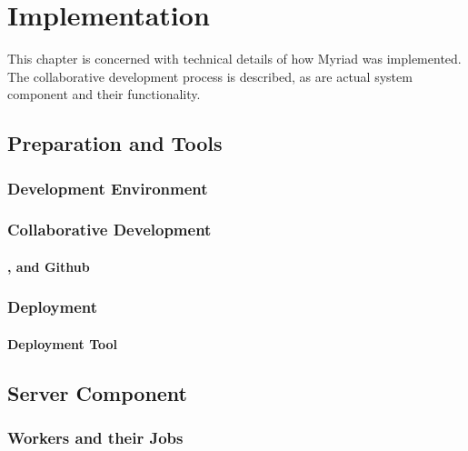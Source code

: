\chapter{Implementation}
\label{chapter:Implementation}

This chapter is concerned with technical details of how Myriad was implemented. The collaborative development process is described, as are actual system component and their functionality.

\section{Preparation and Tools}



\subsection{Development Environment}



\subsection{Collaborative Development}



\subsubsection{,  and Github}



\subsection{Deployment}



\subsubsection{Deployment Tool }




\section{Server Component}


\subsection{Workers and their Jobs}


